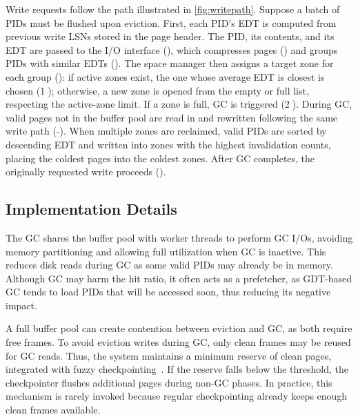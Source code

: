 Write requests follow the path illustrated in \cref{fig:writepath}.
Suppose a batch of PIDs must be flushed upon eviction.
First, each PID’s EDT is computed from previous write LSNs stored in the page header.
The PID, its contents, and its EDT are passed to the I/O interface (), which compresses pages () and groups PIDs with similar EDTs ().
The space manager then assigns a target zone for each group (): 
if active zones exist, the one whose average EDT is closest is chosen (\textcircled{1}); 
otherwise, a new zone is opened from the empty or full list, respecting the active-zone limit.
If a zone is full, GC is triggered (\textcircled{2}).
During GC, valid pages not in the buffer pool are read in and rewritten following the same write path (-).
When multiple zones are reclaimed, valid PIDs are sorted by descending EDT and written into zones with the highest invalidation counts, placing the coldest pages into the coldest zones.
After GC completes, the originally requested write proceeds ().



\subsection{Implementation Details}

The GC shares the buffer pool with worker threads to perform GC I/Os, avoiding memory partitioning and allowing full utilization when GC is inactive.
This reduces disk reads during GC as some valid PIDs may already be in memory.
Although GC may harm the hit ratio, it often acts as a prefetcher, as GDT-based GC tends to load PIDs that will be accessed soon, thus reducing its negative impact.

A full buffer pool can create contention between eviction and GC, as both require free frames.
To avoid eviction writes during GC, only clean frames may be reused for GC reads.
Thus, the system maintains a minimum reserve of clean pages, integrated with fuzzy checkpointing~\cite{leanstore-logging}.
If the reserve falls below the threshold, the checkpointer flushes additional pages during non-GC phases.
In practice, this mechanism is rarely invoked because regular checkpointing already keeps enough clean frames available.

